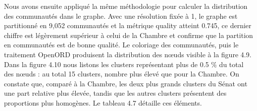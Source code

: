 \documentclass[a4paper,twoside,12pt]{book}
\begin{document}
Nous avons ensuite appliqué la même méthodologie pour calculer la distribution des communautés dans le graphe. Avec une résolution fixée à 1, le graphe est partitionné en 9,052 communautés et la métrique quality atteint 0.745, ce dernier chiffre est légèrement supérieur à celui de la Chambre et confirme que la partition en communautés est de bonne qualité. Le coloriage des communautés, puis le traitement OpenORD produisent la distribution des nœuds visible à la figure 4.9. Dans la figure 4.10 nous listons les clusters représentant plus de 0.5 \% du total des nœuds : au total 15 clusters, nombre plus élevé que pour la Chambre. On constate que, comparé à la Chambre, les deux plus grands clusters du Sénat ont une part relative plus élevée, tandis que les autres clusters présentent des proportions plus homogènes. Le tableau 4.7 détaille ces éléments.
\end{document}
